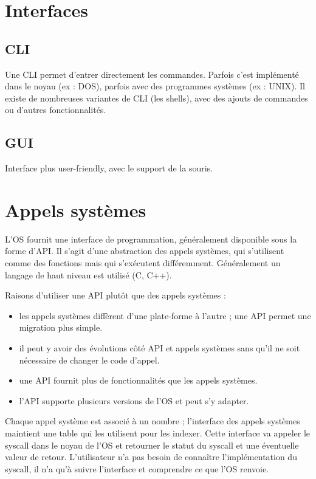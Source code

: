 

\section{Interfaces}

	\subsection{CLI}
	
	Une CLI permet d'entrer directement les commandes. Parfois c'est implémenté dans le noyau (ex : DOS), parfois avec des programmes systèmes (ex : UNIX). Il existe de nombreuses variantes de CLI (les shells), avec des ajouts de commandes ou d'autres fonctionnalités. 
	
	\subsection{GUI}
	
	Interface plus user-friendly, avec le support de la souris.
	
\section{Appels systèmes}

L'OS fournit une interface de programmation, généralement disponible sous la forme d'API. Il s'agit d'une abstraction des appels systèmes, qui s'utilisent comme des fonctions mais qui s'exécutent différemment. Généralement un langage de haut niveau est utilisé (C, C++).

Raisons d'utiliser une API plutôt que des appels systèmes :

\begin{itemize}
	\item les appels systèmes diffèrent d'une plate-forme à l'autre ; une API permet une migration plus simple.
	\item il peut y avoir des évolutions côté API et appels systèmes sans qu'il ne soit nécessaire de changer le code d'appel.
	\item une API fournit plus de fonctionnalités que les appels systèmes.
	\item l'API supporte plusieurs versions de l'OS et peut s'y adapter.
\end{itemize}

Chaque appel système est associé à un nombre ; l'interface des appels systèmes maintient une table qui les utilisent pour les indexer. Cette interface va appeler le syscall dans le noyau de l'OS et retourner le statut du syscall et une éventuelle valeur de retour. L'utilisateur n'a pas besoin de connaître l'implémentation du syscall, il n'a qu'à suivre l'interface et comprendre ce que l'OS renvoie.

